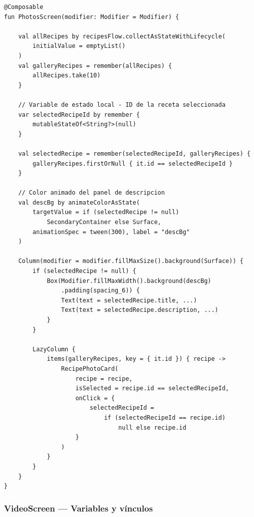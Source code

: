 \documentclass[stu, 12pt, letterpaper, donotrepeattitle, floatsintext, natbib]{apa7}
\begin{document}
\begin{lstlisting}[caption={Variables y vínculos en PhotosScreen.kt}]
@Composable
fun PhotosScreen(modifier: Modifier = Modifier) {

    val allRecipes by recipesFlow.collectAsStateWithLifecycle(
        initialValue = emptyList()
    )
    val galleryRecipes = remember(allRecipes) {
        allRecipes.take(10)
    }

    // Variable de estado local - ID de la receta seleccionada
    var selectedRecipeId by remember {
        mutableStateOf<String?>(null)
    }

    val selectedRecipe = remember(selectedRecipeId, galleryRecipes) {
        galleryRecipes.firstOrNull { it.id == selectedRecipeId }
    }

    // Color animado del panel de descripcion
    val descBg by animateColorAsState(
        targetValue = if (selectedRecipe != null)
            SecondaryContainer else Surface,
        animationSpec = tween(300), label = "descBg"
    )

    Column(modifier = modifier.fillMaxSize().background(Surface)) {
        if (selectedRecipe != null) {
            Box(Modifier.fillMaxWidth().background(descBg)
                .padding(spacing_6)) {
                Text(text = selectedRecipe.title, ...)
                Text(text = selectedRecipe.description, ...)
            }
        }

        LazyColumn {
            items(galleryRecipes, key = { it.id }) { recipe ->
                RecipePhotoCard(
                    recipe = recipe,
                    isSelected = recipe.id == selectedRecipeId,
                    onClick = {
                        selectedRecipeId =
                            if (selectedRecipeId == recipe.id)
                                null else recipe.id
                    }
                )
            }
        }
    }
}
\end{lstlisting}

\subsubsection{VideoScreen --- Variables y vínculos}
\end{document}

